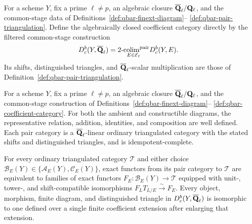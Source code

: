 \begin{definition}
\label{def:qbar-coefficient-category}


For a scheme \(Y\), fix a prime \(\ell\neq p\), an algebraic closure
\(\overline{\mathbf Q}_\ell/\mathbf Q_{\ell}\), and the
common-stage data of Definitions~\ref{def:qbar-finext-diagram}--
\ref{def:qbar-pair-triangulation}.
Define the algebraically closed coefficient category directly by the
filtered common-stage construction
\[
 D^b_c(Y,\overline{\mathbf Q}_\ell)=
 \underset{E\in\mathcal E_\ell}{\operatorname{2-colim}^{\mathrm{pair}}}
 D^b_c(Y,E).
\]
Its shifts, distinguished triangles, and \(\overline{\mathbf Q}_\ell\)-scalar multiplication are
those of Definition~\ref{def:qbar-pair-triangulation}.
\end{definition}


\begin{theorem}
\label{thm:qbar-two-colimit-model}


For a scheme \(Y\), fix a prime \(\ell\neq p\), an algebraic closure
\(\overline{\mathbf Q}_\ell/\mathbf Q_{\ell}\), and the common-stage construction of
Definitions~\ref{def:qbar-finext-diagram}--
\ref{def:qbar-coefficient-category}.
For both the ambient and constructible diagrams, the representative
relation, addition, identities, and composition are well defined.  Each
pair category is a \(\overline{\mathbf Q}_\ell\)-linear ordinary triangulated category with the
stated shifts and distinguished triangles, and is idempotent-complete.

For every ordinary triangulated category \(\mathcal T\) and either choice
\(\mathcal B_E(Y)\in\{\mathcal A_E(Y),\mathcal C_E(Y)\}\), exact functors
from its pair category to \(\mathcal T\) are equivalent to families of
exact functors \(F_E:\mathcal B_E(Y)\to\mathcal T\) equipped with unit-,
tower-, and shift-compatible isomorphisms
\(F_LT_{L/E}\xrightarrow{\sim}F_E\).
Every object, morphism, finite diagram, and distinguished triangle in
\(D^b_c(Y,\overline{\mathbf Q}_\ell)\) is isomorphic to one defined over a single
finite coefficient extension after enlarging that extension.
\end{theorem}

